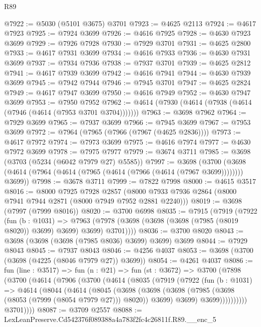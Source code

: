 \begin{lexlean}{R89}
\begin{coremodule}
@7922 := @5030 (@5101 @3675) @3701
@7923 := @4625 @2113
@7924 := @4617 @7923
@7925 := @7924 @3699
@7926 := @4616 @7925
@7928 := @4630 @7923 @3699
@7929 := @7926 @7928
@7930 := @7929 @3701
@7931 := @4625 @2800
@7933 := @4617 @7931 @3699
@7934 := @4616 @7933
@7936 := @4630 @7931 @3699
@7937 := @7934 @7936
@7938 := @7937 @3701
@7939 := @4625 @2812
@7941 := @4617 @7939 @3699
@7942 := @4616 @7941
@7944 := @4630 @7939 @3699
@7945 := @7942 @7944
@7946 := @7945 @3701
@7947 := @4625 @2824
@7949 := @4617 @7947 @3699
@7950 := @4616 @7949
@7952 := @4630 @7947 @3699
@7953 := @7950 @7952
@7962 := @4614 (@7930 (@4614 (@7938 (@4614 (@7946 (@4614 (@7953 @3701 @3704)))))))
@7963 := @3698 @7962
@7964 := @7929 @3699
@7965 := @7937 @3699
@7966 := @7945 @3699
@7967 := @7953 @3699
@7972 := @7964 (@7965 (@7966 (@7967 (@4625 @2836))))
@7973 := @4617 @7972
@7974 := @7973 @3699
@7975 := @4616 @7974
@7977 := @4630 @7972 @3699
@7978 := @7975 @7977
@7979 := @3674 @3711
@7985 := @3698 (@3703 (@5234 (@6042 @7979 @27) @5585))
@7997 := @3698
    (@3700 (@3698 (@4614 (@7964 (@4614 (@7965 (@4614 (@7966 (@4614 (@7967 @3699)))))))) @3699))
@7998 := @3678 @3711
@7999 := @7822 @7998
@8000 := @4615 @3517
@8016 := @8000
    @7925
    @7928
    @2857
    (@8000 @7933 @7936 @2864 (@8000 @7941 @7944 @2871 (@8000 @7949 @7952 @2881 @2240)))
@8019 := @3698 (@7997 (@7999 @8016))
@8020 := @3700 @6998
@8035 := @7915
    (@7919
      (@7922
        (fun (b : @1031) =>
        @7963 (@7978 (@3698 (@3698 (@3698 (@7985 (@8019 @8020)) @3699) @3699) @3699) @3701))))
@8036 := @3700 @8020
@8043 := @3698 (@3698 (@3698 (@7985 @8036) @3699) @3699) @3699
@8044 := @7929 @8043
@8045 := @7937 @8043
@8046 := @4256 @4037
@8053 := @3698 (@3700 (@3698 (@4225 (@8046 @7979 @27)) @3699))
@8054 := @4261 @4037
@8086 := fun (line : @3517) =>
  fun (n : @21) =>
  fun (st : @3672) =>
  @3700
    (@7898
      (@3700
        (@4614
          (@7906
            (@3700
              (@4614
                (@8035
                  (@7919
                    (@7922
                      (fun (b : @1031) =>
                      @4614
                        (@8044
                          (@4614
                            (@8045
                              (@3698
                                (@3698
                                  (@3698
                                    (@7985 (@3698 (@8053 (@7999 (@8054 @7979 @27))) @8020))
                                    @3699)
                                  @3699)
                                @3699))))))))))
            @3701))))
@8087 := @3709 @2557
@8088 := LexLeanPreserve.Cd542376f089388a4a783f2fc4c26811f.R89.__enc_5

\end{coremodule}
\end{lexlean}
